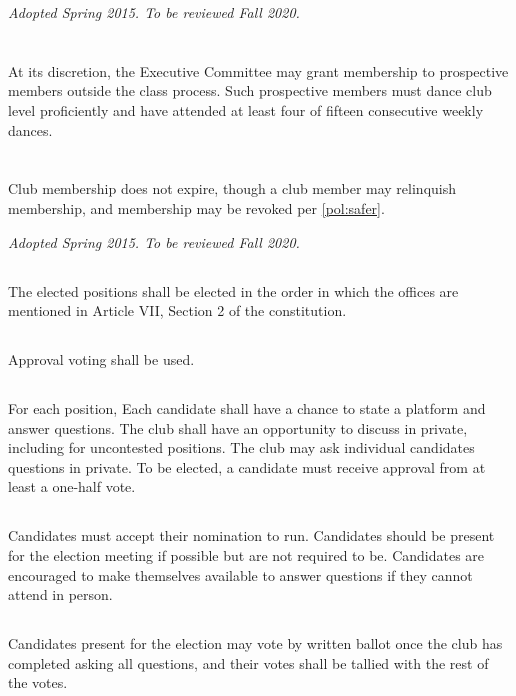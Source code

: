 \documentclass{bylaws}
\newcommand{\sptimes}[2]{\emph{Adopted #1. To be reviewed #2.}}
\begin{document}
\sptimes{Spring 2015}{Fall 2020}

\section{}At its discretion, the Executive Committee may grant membership to prospective members outside the class process. Such prospective members must dance club level proficiently and have attended at least four of fifteen consecutive weekly dances.
\section{}Club membership does not expire, though a club member may relinquish membership, and membership may be revoked per \ref{pol:safer}.


\label{pol:electappoint}
\sptimes{Spring 2015}{Fall 2020}

\label{pol:elect}

\subsection{}The elected positions shall be elected in the order in which the offices are mentioned in Article VII, Section 2 of the constitution.
\subsection{}Approval voting shall be used.
\subsection{}For each position,
\duty Each candidate shall have a chance to state a platform and answer questions.
\duty The club shall have an opportunity to discuss in private, including for uncontested positions.
\duty The club may ask individual candidates questions in private.
\duty To be elected, a candidate must receive approval from at least a one-half vote.
\subsection{}Candidates must accept their nomination to run. Candidates should be present for the election meeting if possible but are not required to be. Candidates are encouraged to make themselves available to answer questions if they cannot attend in person.
\subsection{}Candidates present for the election may vote by written ballot once the club has completed asking all questions, and their votes shall be tallied with the rest of the votes.
\end{document}
